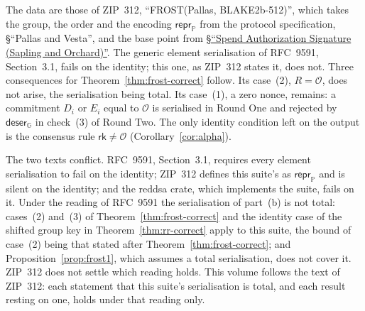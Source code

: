 \documentclass[11pt,a4paper]{article}
\theoremstyle{definition}
\newcommand{\G}{\mathbb{G}}
\newcommand{\PP}{\mathbb{P}}
\newcommand{\rk}{\mathsf{rk}}
\begin{document}
The data are those of ZIP~312, ``FROST(Pallas, BLAKE2b-512)'', which takes
the group, the order and the encoding \(\mathsf{repr}_{\PP}\) from the
protocol specification, \S``Pallas and Vesta'', and the base point from
\href{https://zips.z.cash/protocol/protocol.pdf\#concretespendauthsig}%
{\S``Spend Authorization Signature (Sapling and Orchard)''}. The generic element
serialisation of RFC~9591, Section~3.1, fails on the identity; this one, as
ZIP~312 states it, does not. Three consequences for
Theorem~\ref{thm:frost-correct} follow. Its case~(2), \(R = \mathcal{O}\), does
not arise, the serialisation being total. Its case~(1), a zero nonce, remains: a
commitment \(D_i\) or \(E_i\) equal to \(\mathcal{O}\) is serialised in Round
One and rejected by \(\mathsf{deser}_{\G}\) in check~(3) of Round Two. The only
identity condition left on the output is the consensus rule \(\rk \ne
\mathcal{O}\) (Corollary~\ref{cor:alpha}).

The two texts conflict. RFC~9591, Section~3.1, requires every element
serialisation to fail on the identity; ZIP~312 defines this suite's as
\(\mathsf{repr}_{\PP}\) and is silent on the identity; and the \textsf{reddsa}
crate, which implements the suite, fails on it. Under the reading of RFC~9591
the serialisation of part~(b) is not total: cases~(2) and~(3) of
Theorem~\ref{thm:frost-correct} and the identity case of the shifted group key
in Theorem~\ref{thm:rr-correct} apply to this suite, the bound of case~(2) being
that stated after Theorem~\ref{thm:frost-correct}; and
Proposition~\ref{prop:frost1}, which assumes a total serialisation, does not
cover it. ZIP~312 does not settle which reading holds. This volume follows the
text of ZIP~312: each statement that this suite's serialisation is total, and
each result resting on one, holds under that reading only.
\end{document}
